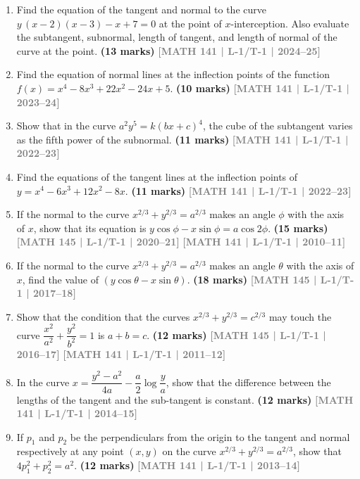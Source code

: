 \documentclass[12pt,a3paper]{article}
\newcommand{\yr}[1]{\hfill\textcolor{gray}{\small\textbf{[#1]}}}
\newcommand{\mk}[1]{\textcolor{orange!70!black}{\small\textbf{(#1 marks)}}}
\begin{document}
\begin{enumerate}


\item Find the equation of the tangent and normal to the curve $y\,(x-2)(x-3)-x+7=0$ at the point of $x$-interception. Also evaluate the subtangent, subnormal, length of tangent, and length of normal of the curve at the point.
\mk{13}  \yr{MATH 141 | L-1/T-1 | 2024--25}

\item Find the equation of normal lines at the inflection points of the function $f(x)=x^{4}-8x^{3}+22x^{2}-24x+5$.
\mk{10} \yr{MATH 141 | L-1/T-1 | 2023--24}

\item Show that in the curve $a^{2}y^{5}=k(bx+c)^{4}$, the cube of the subtangent varies as the fifth power of the subnormal.
\mk{11} \yr{MATH 141 | L-1/T-1 | 2022--23}

\item Find the equations of the tangent lines at the inflection points of $y=x^{4}-6x^{3}+12x^{2}-8x$.
\mk{11} \yr{MATH 141 | L-1/T-1 | 2022--23}

\item If the normal to the curve $x^{2/3}+y^{2/3}=a^{2/3}$ makes an angle $\phi$ with the axis of $x$, show that its equation is $y\cos\phi-x\sin\phi=a\cos 2\phi$.
\mk{15} \yr{MATH 145 | L-1/T-1 | 2020--21} \yr{MATH 141 | L-1/T-1 | 2010--11}

\item If the normal to the curve $x^{2/3}+y^{2/3}=a^{2/3}$ makes an angle $\theta$ with the axis of $x$, find the value of $(y\cos\theta-x\sin\theta)$.
\mk{18} \yr{MATH 145 | L-1/T-1 | 2017--18}

\item Show that the condition that the curves $x^{2/3}+y^{2/3}=c^{2/3}$ may touch the curve $\dfrac{x^{2}}{a^{2}}+\dfrac{y^{2}}{b^{2}}=1$ is $a+b=c$.
\mk{12} \yr{MATH 145 | L-1/T-1 | 2016--17} \yr{MATH 141 | L-1/T-1 | 2011--12}

\item In the curve $x=\dfrac{y^{2}-a^{2}}{4a}-\dfrac{a}{2}\log\dfrac{y}{a}$, show that the difference between the lengths of the tangent and the sub-tangent is constant.
\mk{12} \yr{MATH 141 | L-1/T-1 | 2014--15}

\item If $p_{1}$ and $p_{2}$ be the perpendiculars from the origin to the tangent and normal respectively at any point $(x,y)$ on the curve $x^{2/3}+y^{2/3}=a^{2/3}$, show that $4p_{1}^{2}+p_{2}^{2}=a^{2}$.
\mk{12} \yr{MATH 141 | L-1/T-1 | 2013--14}


\end{enumerate}
\end{document}

